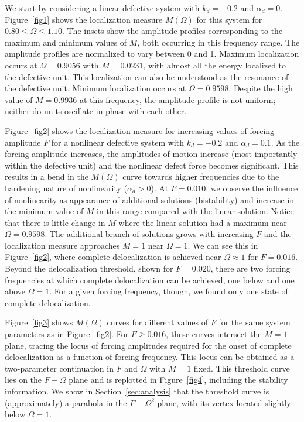 \documentclass[aps,pre,twocolumn,groupedaddress]{revtex4-1}
\begin{document}
We start by considering a linear defective system with $k_d=-0.2$ and $\alpha_d=0$. 
Figure~\ref{fig1} shows the localization measure $M(\Omega)$ for this system for $0.80 \le \Omega \le 1.10$. The insets show the amplitude profiles corresponding to the maximum and minimum values of $M$, both occurring in this frequency range. The amplitude profiles are normalized to vary between 0 and 1.  
Maximum localization occurs at $\Omega = 0.9056$ with $M=0.0231$, with almost all the energy localized to the defective unit. {\color{black}This localization can also be understood as the resonance of the defective unit.} Minimum localization occurs at $\Omega=0.9598$. Despite the high value of $M=0.9936$ at this frequency, the amplitude profile is not uniform; neither do units oscillate in phase with each other. 

Figure~\ref{fig2} shows the localization measure for increasing values of forcing amplitude $F$ for a nonlinear defective system with $k_d=-0.2$ and $\alpha_d=0.1$. As the forcing amplitude increases, the amplitudes of motion increase (most importantly within the defective unit) and the nonlinear defect force becomes significant. This results in a bend in the $M(\Omega)$ curve towards higher frequencies due to the hardening nature of nonlinearity ($\alpha_d>0$). At $F=0.010$, we observe the influence of nonlinearity as appearance of additional solutions (bistability) and increase in the minimum value of $M$ in this range compared with the linear solution. Notice that there is little change in $M$ where the linear solution had a maximum near $\Omega=0.9598$. 
The additional branch of solutions grows with increasing $F$ and the localization measure approaches $M=1$ near $\Omega=1$. We can see this in Figure~\ref{fig2}, where complete delocalization is achieved near $\Omega \approx 1$ for $F=0.016$. 
Beyond the delocalization threshold, shown for $F=0.020$, there are two forcing frequencies at which complete delocalization can be achieved, one below and one above $\Omega=1$. For a given forcing frequency, though, we found only one state of complete delocalization. 


Figure~\ref{fig3} shows $M(\Omega)$ curves for different values of $F$ for the same system parameters as in Figure~\ref{fig2}. For $F \ge 0.016$, these curves intersect the $M=1$ plane, tracing the locus of forcing amplitudes required for the onset of complete delocalization as a function of forcing frequency. 
This locus can be obtained as a two-parameter continuation in $F$ and $\Omega$ with $M=1$ fixed. This threshold curve lies on the $F-\Omega$ plane and is replotted in Figure~\ref{fig4}, including the stability information. We show in Section~\ref{sec:analysis} that the threshold curve is (approximately) a parabola in the $F-\Omega^2$ plane, with its vertex located slightly below $\Omega=1$. 
\end{document}
